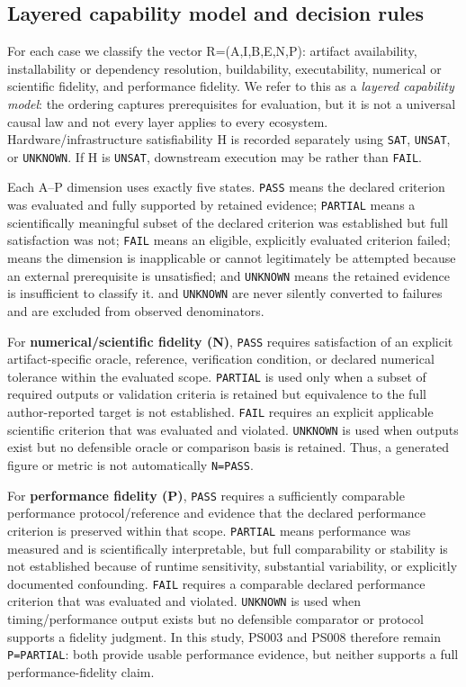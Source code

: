 \documentclass[a4paper,fleqn]{cas-dc}
\begin{document}
\subsection{Layered capability model and decision rules}

For each case we classify the vector R=(A,I,B,E,N,P): artifact availability, installability or dependency resolution, buildability, executability, numerical or scientific fidelity, and performance fidelity. We refer to this as a \emph{layered capability model}: the ordering captures prerequisites for evaluation, but it is not a universal causal law and not every layer applies to every ecosystem. Hardware/infrastructure satisfiability H is recorded separately using \texttt{SAT}, \texttt{UNSAT}, or \texttt{UNKNOWN}. If H is \texttt{UNSAT}, downstream execution may be \protect{} rather than \texttt{FAIL}.

Each A--P dimension uses exactly five states. \texttt{PASS} means the declared criterion was evaluated and fully supported by retained evidence; \texttt{PARTIAL} means a scientifically meaningful subset of the declared criterion was established but full satisfaction was not; \texttt{FAIL} means an eligible, explicitly evaluated criterion failed; \protect{} means the dimension is inapplicable or cannot legitimately be attempted because an external prerequisite is unsatisfied; and \texttt{UNKNOWN} means the retained evidence is insufficient to classify it. \protect{} and \texttt{UNKNOWN} are never silently converted to failures and are excluded from observed denominators.

For \textbf{numerical/scientific fidelity (N)}, \texttt{PASS} requires satisfaction of an explicit artifact-specific oracle, reference, verification condition, or declared numerical tolerance within the evaluated scope. \texttt{PARTIAL} is used only when a subset of required outputs or validation criteria is retained but equivalence to the full author-reported target is not established. \texttt{FAIL} requires an explicit applicable scientific criterion that was evaluated and violated. \texttt{UNKNOWN} is used when outputs exist but no defensible oracle or comparison basis is retained. Thus, a generated figure or metric is not automatically \texttt{N=PASS}.

For \textbf{performance fidelity (P)}, \texttt{PASS} requires a sufficiently comparable performance protocol/reference and evidence that the declared performance criterion is preserved within that scope. \texttt{PARTIAL} means performance was measured and is scientifically interpretable, but full comparability or stability is not established because of runtime sensitivity, substantial variability, or explicitly documented confounding. \texttt{FAIL} requires a comparable declared performance criterion that was evaluated and violated. \texttt{UNKNOWN} is used when timing/performance output exists but no defensible comparator or protocol supports a fidelity judgment. In this study, PS003 and PS008 therefore remain \texttt{P=PARTIAL}: both provide usable performance evidence, but neither supports a full performance-fidelity claim.
\end{document}
